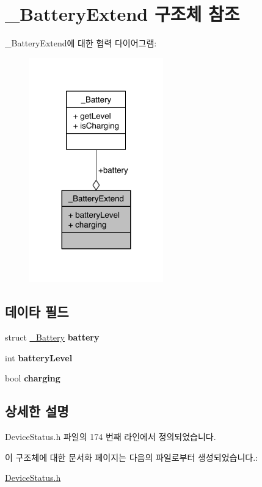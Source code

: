 \hypertarget{struct___battery_extend}{\section{\-\_\-\-Battery\-Extend 구조체 참조}
\label{struct___battery_extend}
}


\-\_\-\-Battery\-Extend에 대한 협력 다이어그램\-:\nopagebreak
\begin{figure}[H]
\begin{center}
\leavevmode
\includegraphics[width=164pt]{struct___battery_extend__coll__graph}
\end{center}
\end{figure}
\subsection*{데이타 필드}
\begin{DoxyCompactItemize}
\item 
\hypertarget{struct___battery_extend_aacdb0ff466391d4b9e2609f452fe2c26}{struct \hyperlink{struct___battery}{\-\_\-\-Battery} {\bfseries battery}}\label{struct___battery_extend_aacdb0ff466391d4b9e2609f452fe2c26}

\item 
\hypertarget{struct___battery_extend_a307d5b105de16d95d6a07e5ec99a49d0}{int {\bfseries battery\-Level}}\label{struct___battery_extend_a307d5b105de16d95d6a07e5ec99a49d0}

\item 
\hypertarget{struct___battery_extend_a1a3cf53e375d57f1f6692704d2701265}{bool {\bfseries charging}}\label{struct___battery_extend_a1a3cf53e375d57f1f6692704d2701265}

\end{DoxyCompactItemize}


\subsection{상세한 설명}


Device\-Status.\-h 파일의 174 번째 라인에서 정의되었습니다.



이 구조체에 대한 문서화 페이지는 다음의 파일로부터 생성되었습니다.\-:\begin{DoxyCompactItemize}
\item 
\hyperlink{_device_status_8h}{Device\-Status.\-h}\end{DoxyCompactItemize}
